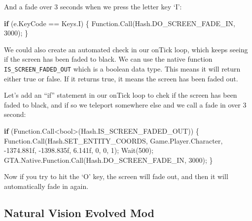 \documentclass[
  openany]{book}
\newenvironment{Shaded}{\begin{snugshade}}{\end{snugshade}}
\newcommand{\DataTypeTok}[1]{\textcolor[rgb]{0.13,0.29,0.53}{#1}}
\newcommand{\DecValTok}[1]{\textcolor[rgb]{0.00,0.00,0.81}{#1}}
\newcommand{\FloatTok}[1]{\textcolor[rgb]{0.00,0.00,0.81}{#1}}
\newcommand{\FunctionTok}[1]{\textcolor[rgb]{0.00,0.00,0.00}{#1}}
\newcommand{\KeywordTok}[1]{\textcolor[rgb]{0.13,0.29,0.53}{\textbf{#1}}}
\newcommand{\NormalTok}[1]{#1}
\begin{document}
And a fade over 3 seconds when we press the letter key `I':

\begin{Shaded}
\begin{Highlighting}[]
\KeywordTok{if}\NormalTok{ (e.}\FunctionTok{KeyCode}\NormalTok{ == Keys.}\FunctionTok{I}\NormalTok{)}
\NormalTok{\{}
\NormalTok{    Function.}\FunctionTok{Call}\NormalTok{(Hash.}\FunctionTok{DO_SCREEN_FADE_IN}\NormalTok{, }\DecValTok{3000}\NormalTok{);}
\NormalTok{\}}
\end{Highlighting}
\end{Shaded}

We could also create an automated check in our onTick loop, which keeps seeing if the screen has been faded to black. We can use the native function \texttt{IS\_SCREEN\_FADED\_OUT} which is a boolean data type. This means it will return either true or false. If it returns true, it means the screen has been faded out.

Let's add an ``if'' statement in our onTick loop to chek if the screen has been faded to black, and if so we teleport somewhere else and we call a fade in over 3 second:

\begin{Shaded}
\begin{Highlighting}[]
\KeywordTok{if}\NormalTok{ (Function.}\FunctionTok{Call}\NormalTok{<}\DataTypeTok{bool}\NormalTok{>(Hash.}\FunctionTok{IS_SCREEN_FADED_OUT}\NormalTok{))}
\NormalTok{\{}
\NormalTok{    Function.}\FunctionTok{Call}\NormalTok{(Hash.}\FunctionTok{SET_ENTITY_COORDS}\NormalTok{, Game.}\FunctionTok{Player}\NormalTok{.}\FunctionTok{Character}\NormalTok{, }\FloatTok{-1374.881f}\NormalTok{, }\FloatTok{-1398.835f}\NormalTok{, }\FloatTok{6.141f}\NormalTok{, }\DecValTok{0}\NormalTok{, }\DecValTok{0}\NormalTok{, }\DecValTok{1}\NormalTok{);}
    \FunctionTok{Wait}\NormalTok{(}\DecValTok{500}\NormalTok{);}
\NormalTok{    GTA.}\FunctionTok{Native}\NormalTok{.}\FunctionTok{Function}\NormalTok{.}\FunctionTok{Call}\NormalTok{(Hash.}\FunctionTok{DO_SCREEN_FADE_IN}\NormalTok{, }\DecValTok{3000}\NormalTok{);}
\NormalTok{\}}
\end{Highlighting}
\end{Shaded}

Now if you try to hit the `O' key, the screen will fade out, and then it will automatically fade in again.

\hypertarget{natural-vision-evolved-mod}{%
\subsection*{Natural Vision Evolved Mod}\label{natural-vision-evolved-mod}}
\end{document}
